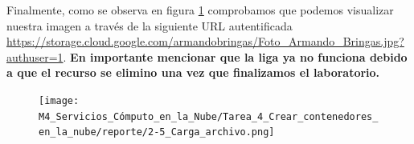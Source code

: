 \documentclass[12pt,a4paper]{article}
\begin{document}
\vspace{10cm}

Finalmente, como se observa en figura \ref{fig:Google_5} comprobamos que podemos visualizar nuestra imagen a través de la siguiente URL autentificada \url{https://storage.cloud.google.com/armandobringas/Foto_Armando_Bringas.jpg?authuser=1}. \textbf{En importante mencionar que la liga ya no funciona debido a que el recurso se elimino una vez que finalizamos el laboratorio.}

\begin{figure}[H]
    \centering
    \texttt{[image: M4\_Servicios\_Cómputo\_en\_la\_Nube/Tarea\_4\_Crear\_contenedores\_en\_la\_nube/reporte/2-5\_Carga\_archivo.png]}
    \label{fig:Google_5}
\end{figure}

\vspace{1em}
\end{document}
